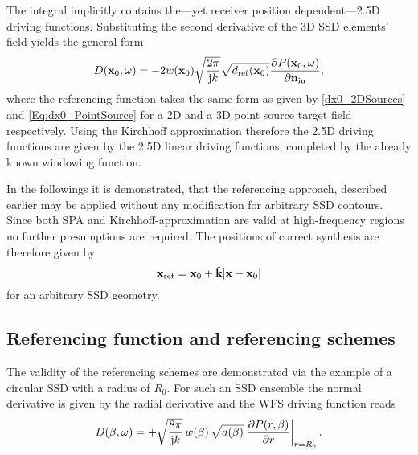 The integral implicitly contains the---yet receiver position dependent---2.5D driving functions. Substituting the second derivative of the 3D SSD elements' field yields the general form 
\begin{equation}
D(\mathbf{x}_0,\omega) = -2 w(\mathbf{x}_0) \sqrt{\frac{2 \pi}{\mathrm{j} k}}\sqrt{d_{\mathrm{ref}}(\mathbf{x}_0)}
\frac{\partial P(\mathbf{x}_0,\omega)}{\partial \mathbf{n}_{\mathrm{in}}},
\end{equation}
where the referencing function takes the same form as given by \eqref{dx0_2DSources} and \eqref{Eq:dx0_PointSource} for a 2D and a 3D point source target field respectively. Using the Kirchhoff approximation therefore the 2.5D driving functions are given by the 2.5D linear driving functions, completed by the already known windowing function.

In the followings it is demonstrated, that the referencing approach, described earlier may be applied without any modification for arbitrary SSD contours. 
Since both SPA and Kirchhoff-approximation are valid at high-frequency regions no further presumptions are required. The positions of correct synthesis are therefore given by
\begin{equation}
\mathbf{x}_{\mathrm{ref}} = \mathbf{x}_0 + \hat{\mathbf{k}} |\mathbf{x}-\mathbf{x}_0|
\end{equation}
for an arbitrary SSD geometry.


\subsection{Referencing function and referencing schemes}

The validity of the referencing schemes are demonstrated via the example of a circular SSD with a radius of $R_0$. 
For such an SSD ensemble the normal derivative is given by the radial derivative and the WFS driving function reads
\begin{equation}
D(\beta,\omega) = + \sqrt{\frac{8\pi}{\mathrm{j} k}}\,w(\beta)\,\sqrt{d(\beta)} \left. \frac{\partial P(r,\beta)}{\partial r}  \right|_{r = R_0}.
\end{equation}


